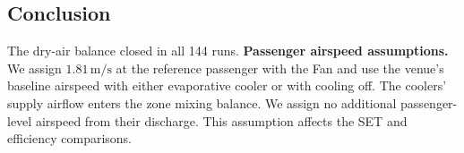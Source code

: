 \subsection{Conclusion}
 
The dry-air balance closed in all 144 runs. \textbf{Passenger airspeed assumptions.} We assign $1.81\,\mathrm{m/s}$ at the reference passenger with the Fan and use the venue's baseline airspeed with either evaporative cooler or with cooling off. The coolers' supply airflow enters the zone mixing balance. We assign no additional passenger-level airspeed from their discharge. This assumption affects the SET and efficiency comparisons.
 